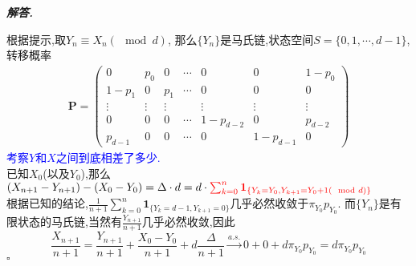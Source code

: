 \documentclass[10pt, a4paper, oneside]{ctexart}
\newenvironment{solution}{%
  \par\noindent\textbf{\textit{解答. }}\ignorespaces
}{%
  \hfill\ensuremath{\square}\par %
}
\begin{document}
\begin{solution}
    根据提示,取$Y_n\equiv X_n (\mod d)$, 那么$\{Y_n\}$是马氏链,状态空间$S=\{0,1,\cdots,d-1\}$,转移概率
    \begin{align*}
        \mathbf{P}=\begin{pmatrix}
            0&p_0&0&\cdots&0&0&1-p_0\\
            1-p_1&0&p_1&\cdots&0&0&0\\
            \vdots&\vdots&\vdots& &\vdots&\vdots&\vdots\\
            0&0&0&\cdots&1-p_{d-2}&0&p_{d-2}\\
            p_{d-1}&0&0&\cdots&0&1-p_{d-1}&0
        \end{pmatrix}
    \end{align*}
    \textcolor{blue}{考察$Y$和$X$之间到底相差了多少.}
    \\已知$X_0$(以及$Y_0$),那么$(X_{n+1}-Y_{n+1})-(X_0-Y_0)=\Delta \cdot d =d\cdot \textcolor{red}{\sum_{k=0}^{n} \mathbf{1}_{\{Y_{k}=Y_0,Y_{k+1}=Y_0+1 (\mod d)\}}}$
    \\根据已知的结论,$\frac{1}{n+1}\sum_{k=0}^{n} \mathbf{1}_{\{Y_{k}=d-1,Y_{k+1}=0\}}$几乎必然收敛于$\pi_{Y_0}p_{Y_0}$. 而$\{Y_n\}$是有限状态的马氏链,当然有$\frac{Y_{n+1}}{n+1}$几乎必然收敛,因此
    $$\frac{X_{n+1}}{n+1}=\frac{Y_{n+1}}{n+1}+\frac{X_0-Y_0}{n+1}+d\frac{\Delta}{n+1}\overset{a.s.}{\to} 0+ 0+ d \pi_{Y_0}p_{Y_0}=d \pi_{Y_0}p_{Y_0}$$
\end{solution}
\end{document}
